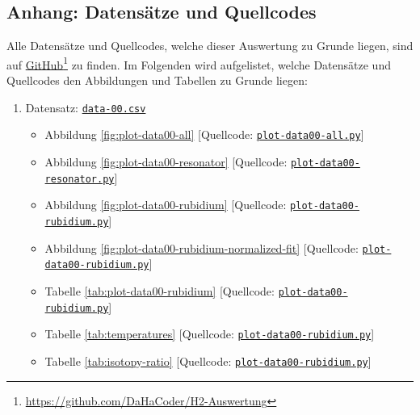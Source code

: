 \begin{appendix}


\chapter{Anhang: Datensätze und Quellcodes}
\label{app:data-and-source-code}

Alle Datensätze und Quellcodes, welche dieser Auswertung zu Grunde liegen, sind auf \href{https://github.com/DaHaCoder/H2-Auswertung}{GitHub}\footnote{\href{https://github.com/DaHaCoder/H2-Auswertung}{https://github.com/DaHaCoder/H2-Auswertung}} zu finden. 
Im Folgenden wird aufgelistet, welche Datensätze und Quellcodes den Abbildungen und Tabellen zu Grunde liegen:
\begin{enumerate}[1.]
    \item Datensatz: \href{https://github.com/DaHaCoder/H2-Auswertung/blob/main/data/data00.csv}{\lstinline{data-00.csv}} 
    \begin{itemize}
        \item Abbildung \ref{fig:plot-data00-all} [Quellcode: \href{https://github.com/DaHaCoder/H2-Auswertung/blob/main/code/plot-data00-all.py}{\lstinline{plot-data00-all.py}}]
        \item Abbildung \ref{fig:plot-data00-resonator} [Quellcode: \href{https://github.com/DaHaCoder/H2-Auswertung/blob/main/code/plot-data00-resonator.py}{\lstinline{plot-data00-resonator.py}}]
        \item Abbildung \ref{fig:plot-data00-rubidium} [Quellcode: \href{https://github.com/DaHaCoder/H2-Auswertung/blob/main/code/plot-data00-rubidium.py}{\lstinline{plot-data00-rubidium.py}}]
        \item Abbildung \ref{fig:plot-data00-rubidium-normalized-fit} [Quellcode: \href{https://github.com/DaHaCoder/H2-Auswertung/blob/main/code/plot-data00-rubidium.py}{\lstinline{plot-data00-rubidium.py}}]
        \item Tabelle \ref{tab:plot-data00-rubidium} [Quellcode: \href{https://github.com/DaHaCoder/H2-Auswertung/blob/main/code/plot-data00-rubidium.py}{\lstinline{plot-data00-rubidium.py}}]
        \item Tabelle \ref{tab:temperatures} [Quellcode: \href{https://github.com/DaHaCoder/H2-Auswertung/blob/main/code/plot-data00-rubidium.py}{\lstinline{plot-data00-rubidium.py}}]
        \item Tabelle \ref{tab:isotopy-ratio} [Quellcode: \href{https://github.com/DaHaCoder/H2-Auswertung/blob/main/code/plot-data00-rubidium.py}{\lstinline{plot-data00-rubidium.py}}]

\end{itemize}
\end{enumerate}
\end{appendix}
